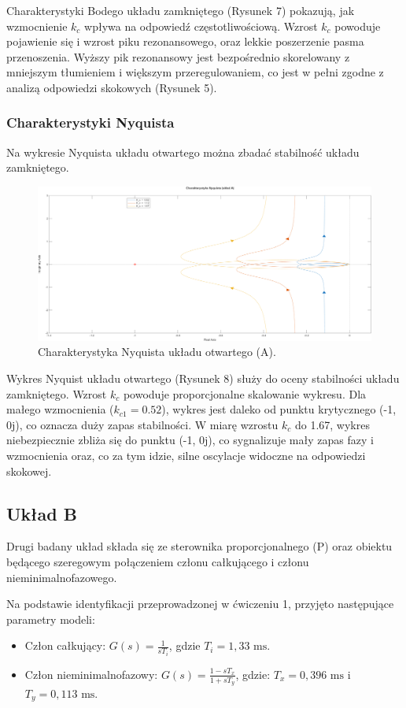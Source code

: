 \documentclass[12pt,a4paper]{article}
\begin{document}
	Charakterystyki Bodego układu zamkniętego (Rysunek 7) pokazują, jak wzmocnienie $k_c$ wpływa na odpowiedź częstotliwościową. Wzrost $k_c$ powoduje pojawienie się i wzrost piku rezonansowego, oraz lekkie poszerzenie pasma przenoszenia. Wyższy pik rezonansowy jest bezpośrednio skorelowany z mniejszym tłumieniem i większym przeregulowaniem, co jest w pełni zgodne z analizą odpowiedzi skokowych (Rysunek 5).
	
	\subsubsection{Charakterystyki Nyquista}
	Na wykresie Nyquista układu otwartego można zbadać stabilność układu zamkniętego.
	
	\begin{figure}[H]
		\centering
		\includegraphics[width=0.8\linewidth]{zdjecia/NQ_ukladA.png}
		\caption{Charakterystyka Nyquista układu otwartego (A).}
		\label{fig:NQ_ukladA}
	\end{figure}

	Wykres Nyquist układu otwartego (Rysunek 8) służy do oceny stabilności układu zamkniętego. Wzrost $k_c$ powoduje proporcjonalne skalowanie wykresu. Dla małego wzmocnienia ($k_{c1}=0.52$), wykres jest daleko od punktu krytycznego (-1, 0j), co oznacza duży zapas stabilności. W miarę wzrostu $k_c$ do 1.67, wykres niebezpiecznie zbliża się do punktu (-1, 0j), co sygnalizuje mały zapas fazy i wzmocnienia oraz, co za tym idzie, silne oscylacje widoczne na odpowiedzi skokowej.
	
	\subsection{Układ B}
	
	Drugi badany układ składa się ze sterownika proporcjonalnego (P) oraz obiektu będącego szeregowym połączeniem członu całkującego i członu nieminimalnofazowego.
	
	Na podstawie identyfikacji przeprowadzonej w ćwiczeniu 1, przyjęto następujące parametry modeli:
	\begin{itemize}
		\item Człon całkujący: $G(s) = \frac{1}{sT_i}$, gdzie $T_i = 1,33 \text{ ms}$.
		\item Człon nieminimalnofazowy: $G(s) = \frac{1-sT_x}{1+sT_y}$, gdzie: $T_x = 0,396 \text{ ms}$ i $T_y = 0,113 \text{ ms}$.
	\end{itemize}
	
\end{document}
